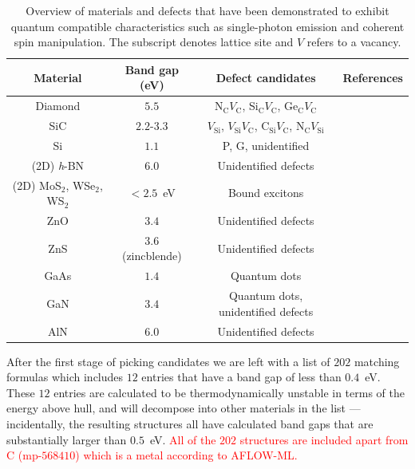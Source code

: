 \documentclass[superscriptaddress,unsortedaddress,
 amsmath,amssymb,
 aps,
]{revtex4-2}
\newcommand{\mrk}[1]{\textcolor{red}{#1}}
\begin{document}
\begin{table}[t]
    \centering 
    \caption{Overview of materials and defects that have been demonstrated to exhibit quantum  compatible characteristics such as single-photon emission and coherent spin manipulation. The subscript denotes lattice site and $V$ refers to a vacancy. }
    \begin{tabular}{c|c|c|c}
    Material & Band gap (eV) & Defect candidates & References \\
    \hline
    Diamond  & $5.5$  & N$_\mathrm{C}V_\mathrm{C}$, Si$_\mathrm{C}V_\mathrm{C}$, Ge$_\mathrm{C}V_\mathrm{C}$ & \cite{Taylor2008,Balasubramanian_2009,Barclay2011,Gordon2013,Rogers_2014,Bhaskar_2018} \\ 
    SiC & $2.2$-$3.3$ & $V_\mathrm{Si}$, $V_\mathrm{Si}V_\mathrm{C}$, C$_\mathrm{Si}V_\mathrm{C}$, N$_\mathrm{C}V_\mathrm{Si}$ & \cite{Widmann2014,Christle_2015,Castelletto_2014,Zargaleh_2018}  \cite{Weber2010, Son2020, Falk2013} \\ 
    Si & $1.1$ & P, G, unidentified & \cite{Muhonen_2014,Durand_2020,Redjem2020} \\ 
    (2D) \textit{h}-BN & $6.0$ & Unidentified defects & \cite{Tran_2016,Tran_2016b,Hayee_2020} \\ 
    (2D) MoS$_2$, WSe$_2$, WS$_2$ & $<2.5$~eV & Bound excitons & \cite{Toth2019} \\
    ZnO & $3.4$ & Unidentified defects & \cite{Morfa2012} \\ 
    ZnS & $3.6$ (zincblende) & Unidentified defects & \cite{Stewart2019} \\ 
    GaAs & $1.4$ & Quantum dots & \cite{Bluhm2010} \\ 
    GaN & $3.4$ & Quantum dots, unidentified defects & \cite{Roux2017,Berhane2018} \\
    AlN & $6.0$ & Unidentified defects & \cite{Xue2020}\\
    \end{tabular}
    \label{tab:qt-materials}
\end{table} 

After the first stage of picking candidates we are left with a list of $202$ matching formulas which includes $12$ entries that have a band gap of less than $0.4$~eV. These $12$ entries are calculated to be thermodynamically unstable in terms of the energy above hull, and will decompose into other materials in the list --- incidentally, the resulting structures all have calculated band gaps that are substantially larger than $0.5$~eV. \mrk{All of the $202$ structures are included apart from C (mp-$568410$) which is a metal according to AFLOW-ML. }
 
\end{document}
